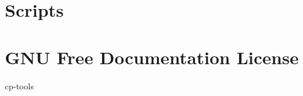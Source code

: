 	\chapter{Scripts}
		
		
		
		
		
		
		
	
	\chapter{GNU Free Documentation License}
		

	
	 {cp-tools}

